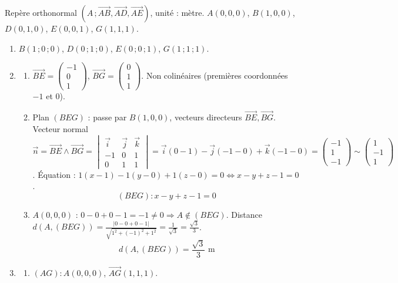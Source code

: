\documentclass[11pt]{article}
\begin{document}
\begin{corrige}
Repère orthonormal $(A\,;\overrightarrow{AB},\overrightarrow{AD},\overrightarrow{AE})$, unité : mètre.
$A(0,0,0)$, $B(1,0,0)$, $D(0,1,0)$, $E(0,0,1)$, $G(1,1,1)$.
\begin{enumerate}
\item $B(1\,;0\,;0)$, $D(0\,;1\,;0)$, $E(0\,;0\,;1)$, $G(1\,;1\,;1)$.

\item \begin{enumerate}
\item $\overrightarrow{BE} = \begin{pmatrix}-1 \\ 0 \\ 1\end{pmatrix}$, $\overrightarrow{BG} = \begin{pmatrix}0 \\ 1 \\ 1\end{pmatrix}$.
Non colinéaires (premières coordonnées $-1$ et $0$).
\item Plan $(BEG)$ : passe par $B(1,0,0)$, vecteurs directeurs $\overrightarrow{BE},\overrightarrow{BG}$.
Vecteur normal $\vec{n} = \overrightarrow{BE}\wedge\overrightarrow{BG} = \begin{vmatrix}\vec{i}&\vec{j}&\vec{k}\\-1&0&1\\0&1&1\end{vmatrix} = \vec{i}(0-1) - \vec{j}(-1-0) + \vec{k}(-1-0) = \begin{pmatrix}-1 \\ 1 \\ -1\end{pmatrix} \sim \begin{pmatrix}1 \\ -1 \\ 1\end{pmatrix}$.
Équation : $1(x-1) -1(y-0) + 1(z-0) = 0 \iff x - y + z - 1 = 0$.
\[
\boxed{(BEG) : x - y + z - 1 = 0}
\]
\item $A(0,0,0)$ : $0 - 0 + 0 - 1 = -1 \neq 0 \Rightarrow A\notin (BEG)$.
Distance $d(A,(BEG)) = \frac{|0-0+0-1|}{\sqrt{1^2+(-1)^2+1^2}} = \frac{1}{\sqrt{3}} = \frac{\sqrt{3}}{3}$.
\[
\boxed{d(A,(BEG)) = \frac{\sqrt{3}}{3}\text{ m}}
\]
\end{enumerate}
\item \begin{enumerate}
\item $(AG) : A(0,0,0)$, $\overrightarrow{AG}(1,1,1)$.

\end{enumerate}
\end{enumerate}
\end{corrige}
\end{document}
